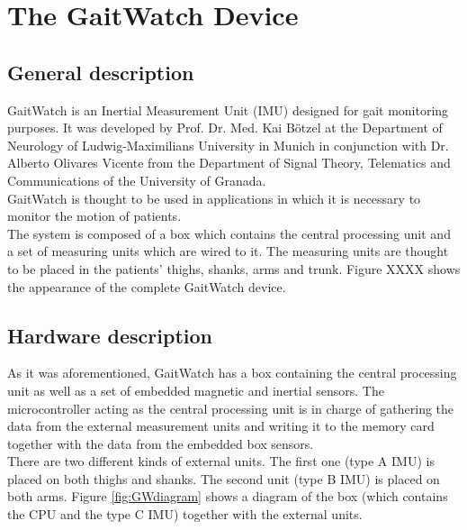 \chapter{The GaitWatch Device}
\label{ch:gaitwatch}

\section{General description}
\indent GaitWatch is an Inertial Measurement Unit (IMU) designed for gait monitoring purposes. It was developed by Prof. Dr. Med. Kai B\"otzel at the Department of Neu\-ro\-lo\-gy of Ludwig-Maximilians University in Munich in conjunction with Dr. Alberto Olivares Vicente from the Department of Signal Theory, Telematics and Communications of the University of Granada. \\
GaitWatch is thought to be used in applications in which it is necessary to monitor the motion of patients. \\
\indent The system is composed of a box which contains the central processing unit and a set of measuring units which are wired to it. The measuring units are thought to be placed in the patients' thighs, shanks, arms and trunk. Figure XXXX shows the appearance of the complete GaitWatch device. 

\section{Hardware description}
\indent As it was aforementioned, GaitWatch has a box containing the central processing unit as well as a set of embedded magnetic and inertial sensors. The microcontroller acting as the central processing unit is in charge of gathering the data from the external measurement units and writing it to the memory card together with the data from the embedded box sensors. \\

\indent There are two different kinds of external units. The first one (type A IMU) is placed on both thighs and shanks. The second unit (type B IMU) is placed on both arms. Figure \ref{fig:GWdiagram} shows a diagram of the box (which contains the CPU and the type C IMU) together with the external units. 

